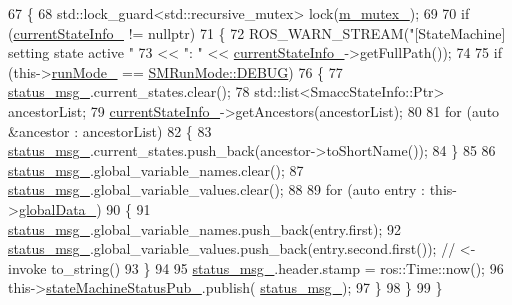 \begin{DoxyCode}
67 \{
68     std::lock\_guard<std::recursive\_mutex> lock(\hyperlink{classsmacc_1_1ISmaccStateMachine_aac785541646e5c517273bf31072505a1}{m\_mutex\_});
69 
70     \textcolor{keywordflow}{if} (\hyperlink{classsmacc_1_1ISmaccStateMachine_a95e42f735cecdc231ad5372bf9fe7eaf}{currentStateInfo\_} != \textcolor{keyword}{nullptr})
71     \{
72         ROS\_WARN\_STREAM(\textcolor{stringliteral}{"[StateMachine] setting state active "}
73                         << \textcolor{stringliteral}{": "} << \hyperlink{classsmacc_1_1ISmaccStateMachine_a95e42f735cecdc231ad5372bf9fe7eaf}{currentStateInfo\_}->getFullPath());
74 
75         \textcolor{keywordflow}{if} (this->\hyperlink{classsmacc_1_1ISmaccStateMachine_a9f8cfbf577f7ae7a48b7a328e2e6b589}{runMode\_} == \hyperlink{namespacesmacc_a3e4f79486ea6ea6342dd3c712d16a4f6adc30ec20708ef7b0f641ef78b7880a15}{SMRunMode::DEBUG})
76         \{
77             \hyperlink{classsmacc_1_1ISmaccStateMachine_a4f47dd614f12a95e7a3c46d465ce4b13}{status\_msg\_}.current\_states.clear();
78             std::list<SmaccStateInfo::Ptr> ancestorList;
79             \hyperlink{classsmacc_1_1ISmaccStateMachine_a95e42f735cecdc231ad5372bf9fe7eaf}{currentStateInfo\_}->getAncestors(ancestorList);
80 
81             \textcolor{keywordflow}{for} (\textcolor{keyword}{auto} &ancestor : ancestorList)
82             \{
83                 \hyperlink{classsmacc_1_1ISmaccStateMachine_a4f47dd614f12a95e7a3c46d465ce4b13}{status\_msg\_}.current\_states.push\_back(ancestor->toShortName());
84             \}
85 
86             \hyperlink{classsmacc_1_1ISmaccStateMachine_a4f47dd614f12a95e7a3c46d465ce4b13}{status\_msg\_}.global\_variable\_names.clear();
87             \hyperlink{classsmacc_1_1ISmaccStateMachine_a4f47dd614f12a95e7a3c46d465ce4b13}{status\_msg\_}.global\_variable\_values.clear();
88 
89             \textcolor{keywordflow}{for} (\textcolor{keyword}{auto} entry : this->\hyperlink{classsmacc_1_1ISmaccStateMachine_ad2f9dae184ea942db632ac4532a10a91}{globalData\_})
90             \{
91                 \hyperlink{classsmacc_1_1ISmaccStateMachine_a4f47dd614f12a95e7a3c46d465ce4b13}{status\_msg\_}.global\_variable\_names.push\_back(entry.first);
92                 \hyperlink{classsmacc_1_1ISmaccStateMachine_a4f47dd614f12a95e7a3c46d465ce4b13}{status\_msg\_}.global\_variable\_values.push\_back(entry.second.first()); \textcolor{comment}{// <- invoke
       to\_string()}
93             \}
94 
95             \hyperlink{classsmacc_1_1ISmaccStateMachine_a4f47dd614f12a95e7a3c46d465ce4b13}{status\_msg\_}.header.stamp = ros::Time::now();
96             this->\hyperlink{classsmacc_1_1ISmaccStateMachine_a55a7c7b26ad4dfea441c62c6326a5414}{stateMachineStatusPub\_}.publish(
      \hyperlink{classsmacc_1_1ISmaccStateMachine_a4f47dd614f12a95e7a3c46d465ce4b13}{status\_msg\_});
97         \}
98     \}
99 \}
\end{DoxyCode}


